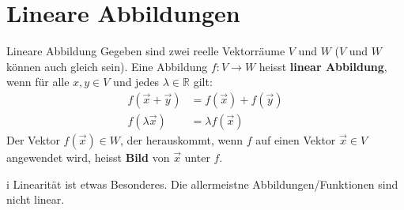 \graphicspath{{images/}}

\section{Lineare Abbildungen}

\begin{definition}{Lineare Abbildung}
    Gegeben sind zwei reelle Vektorräume $V$ und $W$ ($V$ und $W$ können auch gleich sein).
    Eine Abbildung $f: V \to W$ heisst \textbf{linear Abbildung}, wenn für alle $x, y \in V$ und jedes $\lambda \in \mathbb{R}$ gilt:
    \begin{align}
        f(\vec{x}+\vec{y}) &= f(\vec{x}) + f(\vec{y}) \\
        f(\lambda \vec{x}) &= \lambda f(\vec{x})
    \end{align}
    Der Vektor $f(\vec{x})\in W$, der herauskommt, wenn $f$ auf einen Vektor $\vec{x}\in V$ angewendet wird, heisst \textbf{Bild} von $\vec{x}$ unter $f$.
    \begin{highlight}{i}
        Linearität ist etwas Besonderes. Die allermeistne Abbildungen/Funktionen sind nicht linear.
    \end{highlight}
\end{definition}


